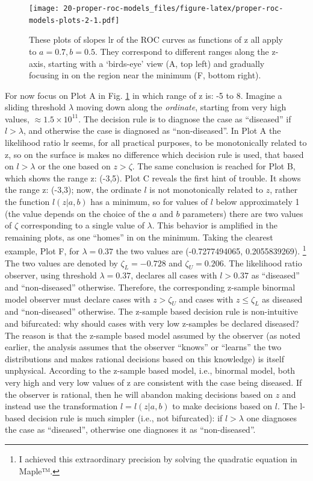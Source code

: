 \documentclass[
]{book}
\begin{document}
\begin{figure}
\centering
\texttt{[image: 20-proper-roc-models\_files/figure-latex/proper-roc-models-plots-2-1.pdf]}
\caption{\label{fig:proper-roc-models-plots-2}These plots of slopes \(\text{lr}\) of the ROC curves as functions of z all apply to \(a = 0.7, b = 0.5\). They correspond to different ranges along the z-axis, starting with a `birds-eye' view (A, top left) and gradually focusing in on the region near the minimum (F, bottom right).}
\end{figure}

For now focus on Plot A in Fig. \ref{fig:proper-roc-models-plots-2} in which range of z is: -5 to 8. Imagine a sliding threshold \(\lambda\) moving down along the \emph{ordinate}, starting from very high values, \(\approx 1.5 \times 10^{11}\). The decision rule is to diagnose the case as ``diseased'' if \(l > \lambda\), and otherwise the case is diagnosed as ``non-diseased''. In Plot A the likelihood ratio \(\text{lr}\) seems, for all practical purposes, to be monotonically related to z, so on the surface is makes no difference which decision rule is used, that based on \(l > \lambda\) or the one based on \(z > \zeta\). The same conclusion is reached for Plot B, which shows the range z: (-3,5). Plot C reveals the first hint of trouble. It shows the range z: (-3,3); now, the ordinate \(l\) is not monotonically related to \(z\), rather the function \(l(z|a,b)\) has a minimum, so for values of \(l\) below approximately 1 (the value depends on the choice of the \(a\) and \(b\) parameters) there are two values of \(\zeta\) corresponding to a single value of \(\lambda\). This behavior is amplified in the remaining plots, as one ``homes'' in on the minimum. Taking the clearest example, Plot F, for \(\lambda = 0.37\) the two values are (-0.7277494065, 0.2055839269). \footnote{I achieved this extraordinary precision by solving the quadratic equation in Maple™.} The two values are denoted by \(\zeta_L=-0.728\) and \(\zeta_U=0.206\). The likelihood ratio observer, using threshold \(\lambda=0.37\), declares all cases with \(l > 0.37\) as ``diseased'' and ``non-diseased'' otherwise. Therefore, the corresponding z-sample binormal model observer must declare cases with \(z > \zeta_U\) and cases with \(z \le \zeta_L\) as diseased and ``non-diseased'' otherwise. The z-sample based decision rule is non-intuitive and bifurcated: why should cases with very low z-samples be declared diseased? The reason is that the z-sample based model assumed by the observer (as noted earlier, the analysis assumes that the observer ``knows'' or ``learns'' the two distributions and makes rational decisions based on this knowledge) is itself unphysical. According to the z-sample based model, i.e., binormal model, both very high and very low values of z are consistent with the case being diseased. If the observer is rational, then he will abandon making decisions based on \(z\) and instead use the transformation \(l=l(z|a,b)\) to make decisions based on \(l\). The l-based decision rule is much simpler (i.e., not bifurcated): if \(l > \lambda\) one diagnoses the case as ``diseased'', otherwise one diagnoses it as ``non-diseased''.
\end{document}
